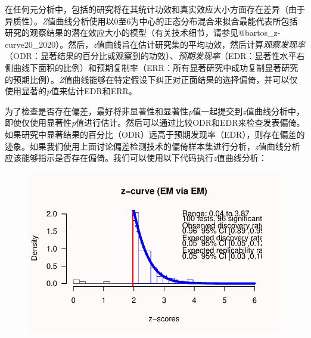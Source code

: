 \documentclass[
  letterpaper,
  DIV=11,
  numbers=noendperiod]{scrreprt}
\newenvironment{Shaded}{\begin{snugshade}}{\end{snugshade}}
\newcommand{\AttributeTok}[1]{\textcolor[rgb]{0.40,0.45,0.13}{#1}}
\newcommand{\ConstantTok}[1]{\textcolor[rgb]{0.56,0.35,0.01}{#1}}
\newcommand{\DecValTok}[1]{\textcolor[rgb]{0.68,0.00,0.00}{#1}}
\newcommand{\FunctionTok}[1]{\textcolor[rgb]{0.28,0.35,0.67}{#1}}
\newcommand{\NormalTok}[1]{\textcolor[rgb]{0.00,0.23,0.31}{#1}}
\newcommand{\OtherTok}[1]{\textcolor[rgb]{0.00,0.23,0.31}{#1}}
\newcommand{\SpecialCharTok}[1]{\textcolor[rgb]{0.37,0.37,0.37}{#1}}
\newcommand{\StringTok}[1]{\textcolor[rgb]{0.13,0.47,0.30}{#1}}
\begin{document}
在任何元分析中，包括的研究将在其统计功效和真实效应大小方面存在差异（由于异质性）。\emph{Z}值曲线分析使用以0至6为中心的正态分布混合来拟合最能代表所包括研究的观察结果的潜在效应大小的模型（有关技术细节，请参见@bartos\_z-curve20\_2020）。然后，\emph{z}值曲线旨在估计研究集的平均功效，然后计算\emph{观察发现率}（ODR：显著结果的百分比或观察到的功效）、\emph{预期发现率}（EDR：显著性水平右侧曲线下面积的比例）和预期复制率（ERR：所有显著研究中成功复制显著研究的预期比例）。\emph{Z}值曲线能够在特定假设下纠正对正面结果的选择偏倚，并可以仅使用显著的\emph{p}值来估计EDR和ERR。

为了检查是否存在偏差，最好将非显著性和显著性\emph{p}值一起提交到\emph{z}值曲线分析中，即使仅使用显著性\emph{p}值进行估计。然后可以通过比较ODR和EDR来检查发表偏倚。如果研究中显著结果的百分比（ODR）远高于预期发现率（EDR），则存在偏差的迹象。如果我们使用上面讨论偏差检测技术的偏倚样本集进行分析，\emph{z}值曲线分析应该能够指示是否存在偏倚。我们可以使用以下代码执行\emph{z}值曲线分析：

\begin{Shaded}
\end{Shaded}

\begin{figure}

{\centering \includegraphics[width=1\textwidth,height=\textheight]{12-bias_files/figure-pdf/unnamed-chunk-4-1.pdf}

}

\end{figure}
\end{document}
